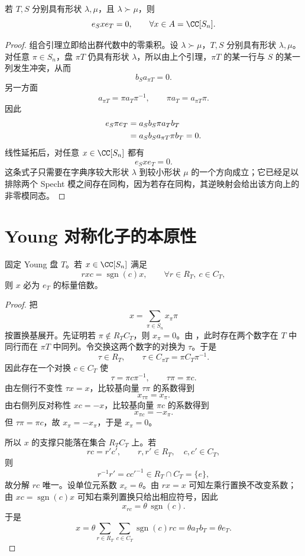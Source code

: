 \begin{proposition}
若 $T,S$ 分别具有形状 $\lambda,\mu$，且 $\lambda\succ\mu$，则
\[
e_Sxe_T=0,\qquad \forall x\in A=\CC[S_n].
\]
\end{proposition}

\begin{proof}
组合引理立即给出群代数中的零乘积。设 $\lambda\succ\mu$，$T,S$ 分别具有形状 $\lambda,\mu$。对任意 $\pi\in S_n$，盘 $\pi T$ 仍具有形状 $\lambda$，所以由上个引理，$\pi T$ 的某一行与 $S$ 的某一列发生冲突，从而
\[
b_Sa_{\pi T}=0.
\]
另一方面
\[
a_{\pi T}=\pi a_T\pi^{-1},
\qquad
\pi a_T=a_{\pi T}\pi.
\]
因此
\begin{align}
e_S\pi e_T
&=a_Sb_S\pi a_Tb_T\notag\\
&=a_Sb_Sa_{\pi T}\pi b_T=0.
\label{eq:different-shape-zero}
\end{align}
线性延拓后，对任意 $x\in\CC[S_n]$ 都有
\[
e_Sxe_T=0.
\]
这条式子只需要在字典序较大形状 $\lambda$ 到较小形状 $\mu$ 的一个方向成立；它已经足以排除两个 Specht 模之间存在同构，因为若存在同构，其逆映射会给出该方向上的非零模同态。
\end{proof}

\section{\texorpdfstring{Young 对称化子的本原性}{Young 对称化子的本原性}}

\begin{lemma}
固定 Young 盘 $T$。若 $x\in\CC[S_n]$ 满足
\begin{equation}
rxc=\operatorname{sgn}(c)x,
\qquad
\forall r\in R_T,\ c\in C_T,
\label{eq:young-bi-equivariance}
\end{equation}
则 $x$ 必为 $e_T$ 的标量倍数。

\end{lemma}

\begin{proof}
把
\[
x=\sum_{\pi\in S_n}x_\pi\pi
\]
按置换基展开。先证明若 $\pi\notin R_TC_T$，则 $x_\pi=0$。由 ，此时存在两个数字在 $T$ 中同行而在 $\pi T$ 中同列。令交换这两个数字的对换为 $\tau$。于是
\[
\tau\in R_T,
\qquad
\tau\in C_{\pi T}=\pi C_T\pi^{-1}.
\]
因此存在一个对换 $c\in C_T$ 使
\[
\tau=\pi c\pi^{-1},
\qquad
\tau\pi=\pi c.
\]
由左侧行不变性 $\tau x=x$，比较基向量 $\tau\pi$ 的系数得到
\[
x_{\tau\pi}=x_\pi.
\]
由右侧列反对称性 $xc=-x$，比较基向量 $\pi c$ 的系数得到
\[
x_{\pi c}=-x_\pi.
\]
但 $\tau\pi=\pi c$，故 $x_\pi=-x_\pi$，于是 $x_\pi=0$。

所以 $x$ 的支撑只能落在集合 $R_TC_T$ 上。若
\[
rc=r'c',
\qquad r,r'\in R_T,\quad c,c'\in C_T,
\]
则
\[
r^{-1}r'=cc'^{-1}\in R_T\cap C_T=\{e\},
\]
故分解 $rc$ 唯一。设单位元系数 $x_e=\theta$。由 $rx=x$ 可知左乘行置换不改变系数；由 $xc=\operatorname{sgn}(c)x$ 可知右乘列置换只给出相应符号，因此
\[
x_{rc}=\theta\,\operatorname{sgn}(c).
\]
于是
\[
x
=\theta\sum_{r\in R_T}\sum_{c\in C_T}\operatorname{sgn}(c)rc
=\theta a_Tb_T
=\theta e_T.
\]
\end{proof}

